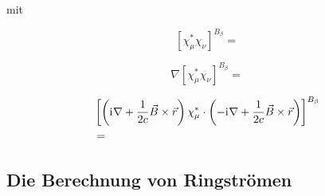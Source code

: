 mit

\begin{equation}
\left[\chi_\mu^*\chi_\nu\right]^{B_\beta}=
\end{equation}

\begin{equation}
\nabla \left[\chi_\mu^*\chi_\nu\right]^{B_\beta}=
\end{equation}

\begin{equation}
\begin{aligned}
&\left[\left(\mathrm{i}\mkern1mu\nabla +\frac{1}{2c}\vec{B}\times\vec{r}\right)\chi_\mu^*\cdot\left(-\mathrm{i}\mkern1mu\nabla+\frac{1}{2c}\vec{B}\times\vec{r}\right)\right]
^{B_\beta}\\
&=
\end{aligned}
\end{equation}
    
\subsection{Die Berechnung von Ringströmen}
